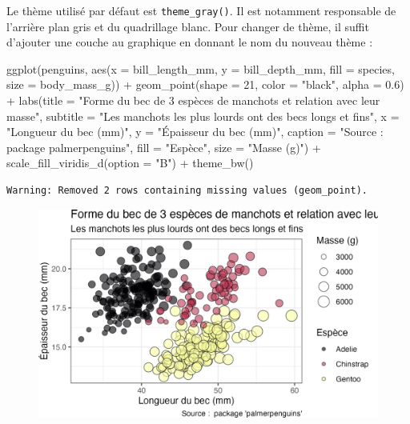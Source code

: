 \documentclass[
  letterpaper,
  DIV=11,
  numbers=noendperiod]{scrreprt}
\newenvironment{Shaded}{\begin{snugshade}}{\end{snugshade}}
\newcommand{\AttributeTok}[1]{\textcolor[rgb]{0.40,0.45,0.13}{#1}}
\newcommand{\DecValTok}[1]{\textcolor[rgb]{0.68,0.00,0.00}{#1}}
\newcommand{\FloatTok}[1]{\textcolor[rgb]{0.68,0.00,0.00}{#1}}
\newcommand{\FunctionTok}[1]{\textcolor[rgb]{0.28,0.35,0.67}{#1}}
\newcommand{\NormalTok}[1]{\textcolor[rgb]{0.00,0.23,0.31}{#1}}
\newcommand{\SpecialCharTok}[1]{\textcolor[rgb]{0.37,0.37,0.37}{#1}}
\newcommand{\StringTok}[1]{\textcolor[rgb]{0.13,0.47,0.30}{#1}}
\begin{document}
Le thème utilisé par défaut est \texttt{theme\_gray()}. Il est notamment
responsable de l'arrière plan gris et du quadrillage blanc. Pour changer
de thème, il suffit d'ajouter une couche au graphique en donnant le nom
du nouveau thème :

\begin{Shaded}
\begin{Highlighting}[]
\FunctionTok{ggplot}\NormalTok{(penguins, }\FunctionTok{aes}\NormalTok{(}\AttributeTok{x =}\NormalTok{ bill\_length\_mm, }\AttributeTok{y =}\NormalTok{ bill\_depth\_mm,}
                     \AttributeTok{fill =}\NormalTok{ species, }\AttributeTok{size =}\NormalTok{ body\_mass\_g)) }\SpecialCharTok{+}
  \FunctionTok{geom\_point}\NormalTok{(}\AttributeTok{shape =} \DecValTok{21}\NormalTok{, }\AttributeTok{color =} \StringTok{"black"}\NormalTok{, }\AttributeTok{alpha =} \FloatTok{0.6}\NormalTok{) }\SpecialCharTok{+}
  \FunctionTok{labs}\NormalTok{(}\AttributeTok{title =} \StringTok{"Forme du bec de 3 espèces de manchots et relation avec leur masse"}\NormalTok{,}
       \AttributeTok{subtitle =} \StringTok{"Les manchots les plus lourds ont des becs longs et fins"}\NormalTok{,}
       \AttributeTok{x =} \StringTok{"Longueur du bec (mm)"}\NormalTok{,}
       \AttributeTok{y =} \StringTok{"Épaisseur du bec (mm)"}\NormalTok{,}
       \AttributeTok{caption =} \StringTok{"Source :  package \textquotesingle{}palmerpenguins\textquotesingle{}"}\NormalTok{,}
       \AttributeTok{fill =} \StringTok{"Espèce"}\NormalTok{,}
       \AttributeTok{size =} \StringTok{"Masse (g)"}\NormalTok{) }\SpecialCharTok{+}
  \FunctionTok{scale\_fill\_viridis\_d}\NormalTok{(}\AttributeTok{option =} \StringTok{"B"}\NormalTok{) }\SpecialCharTok{+}
  \FunctionTok{theme\_bw}\NormalTok{()}
\end{Highlighting}
\end{Shaded}

\begin{verbatim}
Warning: Removed 2 rows containing missing values (geom_point).
\end{verbatim}

\begin{figure}[H]

{\centering \includegraphics{./03-visualization_files/figure-pdf/unnamed-chunk-109-1.png}

}

\end{figure}
\end{document}
